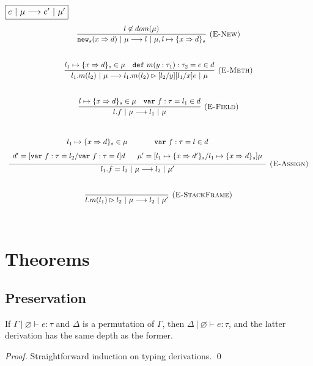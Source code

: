 \documentclass{llncs}
\newcommand{\keywadj}[1]{\mathtt{#1}}
\newcommand{\keyw}[1]{\keywadj{#1}~}
\begin{document}
$\fbox{$e~|~\mu \longrightarrow e'~|~\mu'$}$
\[
\begin{array}{c}
\infer[\textsc{(E-New)}]
  {\keywadj{new}_{s}(x \Rightarrow d)~|~\mu \longrightarrow l~|~\mu, l \mapsto \{ x \Rightarrow d \}_{s}}
  {l \not\in dom(\mu)}\\[5ex]

\infer[\textsc{(E-Meth)}]
  {l_1.m(l_2)~|~\mu \longrightarrow l_1.m(l_2) \rhd [l_2/y][l_1/x]e~|~\mu}
  {l_1 \mapsto \{ x \Rightarrow d \}_{s} \in \mu & \keyw{def} m(y : \tau_1) : \tau_2 = e \in d}\\[5ex]

\infer[\textsc{(E-Field)}]
  {l.f~|~\mu \longrightarrow l_1~|~\mu}
  {l \mapsto \{ x \Rightarrow d \}_{s} \in \mu & \keyw{var} f:\tau = l_1 \in d}\\[5ex]

\infer[\textsc{(E-Assign)}]
  {l_1.f = l_2~|~\mu \longrightarrow l_2~|~\mu'}
  {\def\arraystretch{1.6}
  \begin{array}{c}
l_1 \mapsto \{ x \Rightarrow d \}_{s} \in \mu~~~~~~~~~~~\keyw{var} f:\tau = l \in d \\
d' = [\keyw{var} f:\tau = l_2/\keyw{var} f:\tau = l]d~~~~~\mu' = [l_1 \mapsto \{ x \Rightarrow d' \}_{s}/l_1 \mapsto \{ x \Rightarrow d \}_{s}]\mu
  \end{array}}\\[5ex]

\infer[\textsc{(E-StackFrame)}]
  {l.m(l_1) \rhd l_2~|~\mu \longrightarrow l_2~|~\mu'}
  {}\\[5ex]
  
\end{array}
\]

\newpage

\section{Theorems}

\subsection{Preservation}

\begin{lemma}[Permutation]
If $\Gamma~|~\varnothing \vdash e : \tau$ and $\Delta$ is a permutation of $\Gamma$, then $\Delta~|~\varnothing \vdash e : \tau$, and the latter derivation has the same depth as the former.
\end{lemma}

\begin{proof}
Straightforward induction on typing derivations. \qed
\end{proof}
\end{document}
